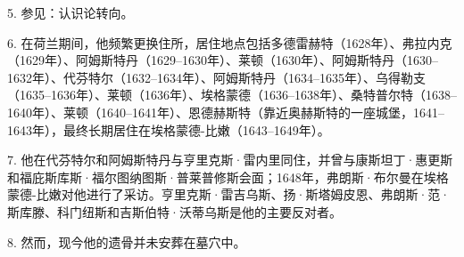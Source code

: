 5. 参见：认识论转向。

6. 在荷兰期间，他频繁更换住所，居住地点包括多德雷赫特（1628年）、弗拉内克（1629年）、阿姆斯特丹（1629–1630年）、莱顿（1630年）、阿姆斯特丹（1630–1632年）、代芬特尔（1632–1634年）、阿姆斯特丹（1634–1635年）、乌得勒支（1635–1636年）、莱顿（1636年）、埃格蒙德（1636–1638年）、桑特普尔特（1638–1640年）、莱顿（1640–1641年）、恩德赫斯特（靠近奥赫斯特的一座城堡，1641–1643年），最终长期居住在埃格蒙德-比嫩（1643–1649年）。

7. 他在代芬特尔和阿姆斯特丹与亨里克斯·雷内里同住，并曾与康斯坦丁·惠更斯和福庇斯库斯·福尔图纳图斯·普莱普修斯会面；1648年，弗朗斯·布尔曼在埃格蒙德-比嫩对他进行了采访。亨里克斯·雷吉乌斯、扬·斯塔姆皮恩、弗朗斯·范·斯库滕、科门纽斯和吉斯伯特·沃蒂乌斯是他的主要反对者。

8. 然而，现今他的遗骨并未安葬在墓穴中。
